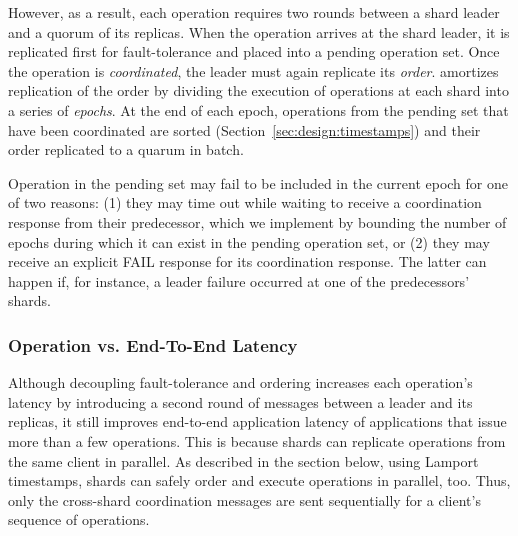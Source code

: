 However, as a result, each operation requires two rounds between a shard leader
and a quorum of its replicas. When the operation arrives at the shard leader, it
is replicated first for fault-tolerance and placed into a pending operation set.
Once the operation is \textit{coordinated}, the leader must again replicate its
\emph{order}. \sys{} amortizes replication of the order by dividing the
execution of operations at each shard into a series of \textit{epochs}. At the
end of each epoch, operations from the pending set that have been coordinated
are sorted (Section~\ref{sec:design:timestamps}) and their order replicated to a
quarum in batch.



Operation in the pending set may fail to be included in the current epoch for
one of two reasons: (1) they may time out while waiting to receive a
coordination response from their predecessor, which we implement by bounding the
number of epochs during which it can exist in the pending operation set, or (2)
they may receive an explicit FAIL response for its coordination response. The
latter can happen if, for instance, a leader failure occurred at one of the
predecessors' shards.


\subsubsection{Operation vs. End-To-End Latency}

Although decoupling fault-tolerance and ordering increases each operation's latency by introducing a
second round of messages between a leader and its replicas, it still improves end-to-end application
latency of applications that issue more than a few operations. This is because shards can replicate
operations from the same client in parallel. As described in the section below, using Lamport timestamps,
shards can safely order and execute operations in parallel, too. Thus, only the cross-shard coordination
messages are sent sequentially for a client's sequence of operations.

